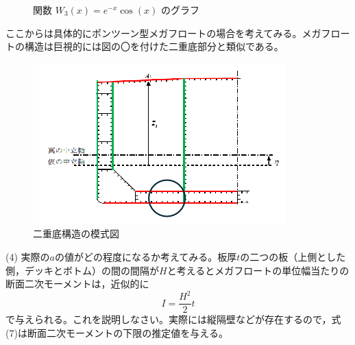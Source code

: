 \documentclass[dvipdfmx,a4paper]{jsarticle}
\begin{document}

\begin{figure}[H]
    \centering
    
    \caption{関数 $W_3(x) = e^{-x}\cos(x)$ のグラフ}
    
\end{figure}
    
    \vspace{1cm}
    
    ここからは具体的にポンツーン型メガフロートの場合を考えてみる。メガフロートの構造は巨視的には図の〇を付けた二重底部分と類似である。
    
    \begin{figure}[H]
        \centering
        \includegraphics[width=0.7\linewidth]{summer/fluid-tructure-interactions/day2.02.png}
        \caption{二重底構造の模式図}
        \label{fig:double_bottom}
    \end{figure}
    
    (4) 実際の$a$の値がどの程度になるか考えてみる。板厚$t$の二つの板（上側とした側，デッキとボトム）の間の間隔が$H$と考えるとメガフロートの単位幅当たりの断面二次モーメントは，近似的に
    \begin{equation}
        I=\frac{H^2}{2}t \label{eq:moment_of_inertia}
    \end{equation}
    で与えられる。これを説明しなさい。実際には縦隔壁などが存在するので，式(7)は断面二次モーメントの下限の推定値を与える。
    
\end{document}
